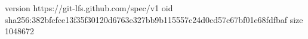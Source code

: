 version https://git-lfs.github.com/spec/v1
oid sha256:382bfcfce13f35f30120d6763e327bb9b115557c24d0cd57c67bf01e68fdfbaf
size 1048672
